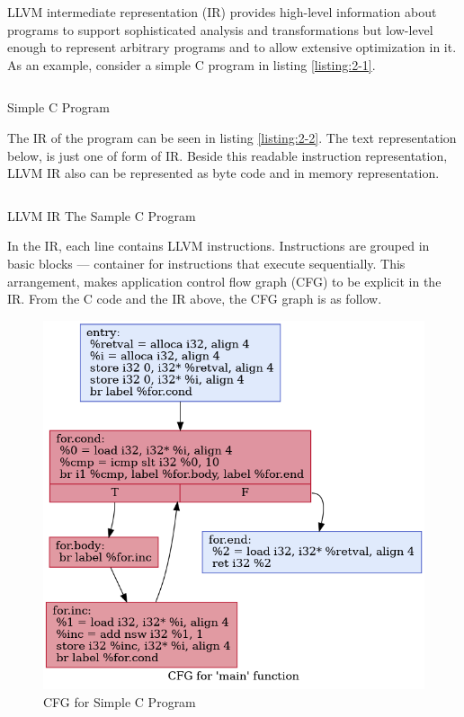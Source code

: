 LLVM intermediate representation (IR) provides high-level information about programs to support sophisticated analysis and transformations but low-level enough to represent arbitrary programs and to allow extensive optimization in it. As an example, consider a simple C program in listing \ref{listing:2-1}.

\begin{listing}
\inputminted[]{c}{code/sample.c}
\caption{Simple C Program}    
\label{listing:2-1}
\end{listing}

The IR of the program can be seen in listing \ref{listing:2-2}. The text representation below, is just one of form of IR. Beside this readable instruction representation, LLVM IR also can be represented as byte code and in memory representation.

\begin{listing}
\inputminted[]{llvm}{code/sample.ll}
\caption{LLVM IR The Sample C Program}    
\label{listing:2-2}
\end{listing}

In the IR, each line contains LLVM instructions. Instructions are grouped in basic blocks — container for instructions that execute sequentially. This arrangement, makes application control flow graph (CFG) to be explicit in the IR. From the C code and the IR above, the CFG graph is as follow.

\begin{figure}[htbp]
\centerline{\includegraphics[scale=.5]{Figures/cfg.png}}
\caption{CFG for Simple C Program}
\label{fig:2-1}
\end{figure}

